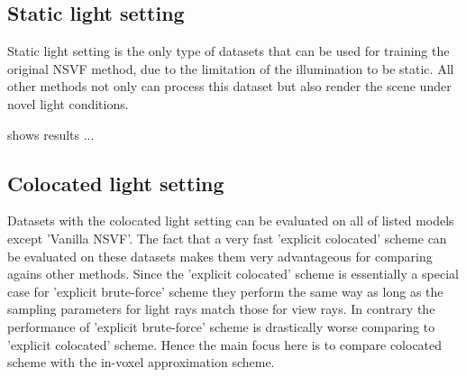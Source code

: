 \subsection{Static light setting}

Static light setting is the only type of datasets that can be used
for training the original NSVF method,
due to the limitation of the illumination to be static.
All other methods not only can process this dataset but also render the scene under novel light conditions.

 shows results ...




\subsection{Colocated light setting}


Datasets with the colocated light setting can be evaluated on all of listed models except 'Vanilla NSVF'.
The fact that a very fast 'explicit colocated' scheme can be evaluated on these datasets
makes them very advantageous for comparing agains other methods.
Since the 'explicit colocated' scheme is essentially a special case for 'explicit brute-force' scheme
they perform the same way as long as the sampling parameters for light rays match those for view rays.
In contrary the performance of 'explicit brute-force' scheme is drastically worse comparing to 'explicit colocated' scheme.
Hence the main focus here is to compare colocated scheme with the in-voxel approximation scheme.


